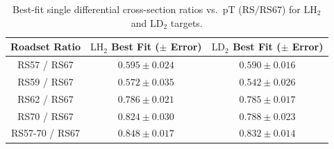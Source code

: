 \begin{table}[htbp]
\centering
\caption{Best-fit single differential cross-section ratios vs.\ pT ($\text{RS} / \text{RS67}$) for $\text{LH}_2$ and $\text{LD}_2$ targets.}
\label{tab:xsec_ratios_pt_vs_rs67_previous}
\begin{tabular}{|c|c|c|}
\hline
\textbf{Roadset Ratio} & \textbf{$\text{LH}_2$ Best Fit ($\pm$ Error)} & \textbf{$\text{LD}_2$ Best Fit ($\pm$ Error)} \\
\hline
RS57 / RS67 & $0.595 \pm 0.024$ & $0.590 \pm 0.016$ \\
\hline
RS59 / RS67 & $0.572 \pm 0.035$ & $0.542 \pm 0.026$ \\
\hline
RS62 / RS67 & $0.786 \pm 0.021$ & $0.785 \pm 0.017$ \\
\hline
RS70 / RS67 & $0.824 \pm 0.030$ & $0.788 \pm 0.023$ \\
\hline
RS57-70 / RS67 & $0.848 \pm 0.017$ & $0.832 \pm 0.014$ \\
\hline
\end{tabular}
\end{table}

